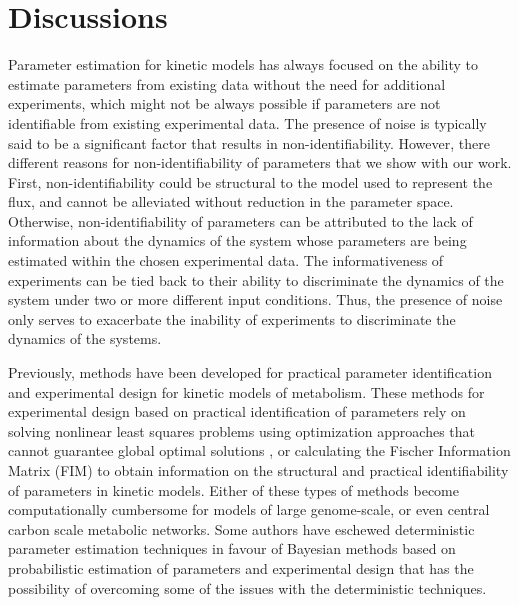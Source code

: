 \documentclass[10pt]{article}
\begin{document}
	\section{Discussions}\label{sec:discussion}	
	Parameter estimation for kinetic models has always focused on the ability to estimate parameters from existing data without the need for additional experiments, which might not be always possible if parameters are not identifiable from existing experimental data. The presence of noise is typically said to be a significant factor that results in non-identifiability. However, there different reasons for non-identifiability of parameters that we show with our work. First, non-identifiability could be structural to the model used to represent the flux, and cannot be alleviated without reduction in the parameter space. Otherwise, non-identifiability of parameters can be attributed to the lack of information about the dynamics of the system whose parameters are being estimated within the chosen experimental data. The informativeness of experiments can be tied back to their ability to discriminate the dynamics of the system under two or more different input conditions. Thus, the presence of noise only serves to exacerbate the inability of experiments to discriminate the dynamics of the systems. 
	
	Previously, methods have been developed for practical parameter identification and experimental design for kinetic models of metabolism. These methods for experimental design based on practical identification of parameters rely on solving nonlinear least squares problems using optimization approaches that cannot guarantee global optimal solutions \parencite{Raue2009a}, or calculating the Fischer Information Matrix (FIM) to obtain information on the structural and practical identifiability of parameters in kinetic models. Either of these types of methods become computationally cumbersome for models of large genome-scale, or even central carbon scale metabolic networks. Some authors have eschewed deterministic parameter estimation techniques in favour of Bayesian methods based on probabilistic estimation of parameters and experimental design \parencite{Saa2016, Saa2016a} that has the possibility of overcoming some of the issues with the deterministic techniques. 	
	 
\end{document}
